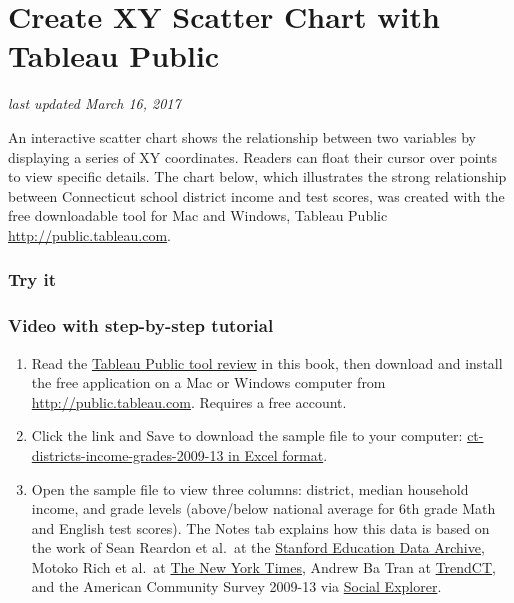 \documentclass[
  english,
]{book}
\begin{document}
\hypertarget{scatter-chart-tableau}{%
\section{Create XY Scatter Chart with Tableau Public}\label{scatter-chart-tableau}}

\emph{last updated March 16, 2017}

An interactive scatter chart shows the relationship between two variables by displaying a series of XY coordinates. Readers can float their cursor over points to view specific details. The chart below, which illustrates the strong relationship between Connecticut school district income and test scores, was created with the free downloadable tool for Mac and Windows, Tableau Public \url{http://public.tableau.com}.

\hypertarget{try-it}{%
\subsubsection*{Try it}\label{try-it}}

\hypertarget{video-with-step-by-step-tutorial-1}{%
\subsubsection*{Video with step-by-step tutorial}\label{video-with-step-by-step-tutorial-1}}

\begin{enumerate}
\def\labelenumi{\arabic{enumi})}
\item
  Read the \href{tableau-public}{Tableau Public tool review} in this book, then download and install the free application on a Mac or Windows computer from \url{http://public.tableau.com}. Requires a free account.
\item
  Click the link and Save to download the sample file to your computer: \href{data/ct-districts-income-grades-2009-13.xlsx}{ct-districts-income-grades-2009-13 in Excel format}.
\item
  Open the sample file to view three columns: district, median household income, and grade levels (above/below national average for 6th grade Math and English test scores). The Notes tab explains how this data is based on the work of Sean Reardon et al.~at the \href{http://purl.stanford.edu/db586ns4974}{Stanford Education Data Archive}, Motoko Rich et al.~at \href{http://www.nytimes.com/interactive/2016/04/29/upshot/money-race-and-success-how-your-school-district-compares.html}{The New York Times}, Andrew Ba Tran at \href{http://trendct.org/2016/05/06/wealth-and-grades-compare-connecticuts-school-districts/}{TrendCT}, and the American Community Survey 2009-13 via \href{http://socialexplorer.com}{Social Explorer}.
\end{enumerate}
\end{document}
